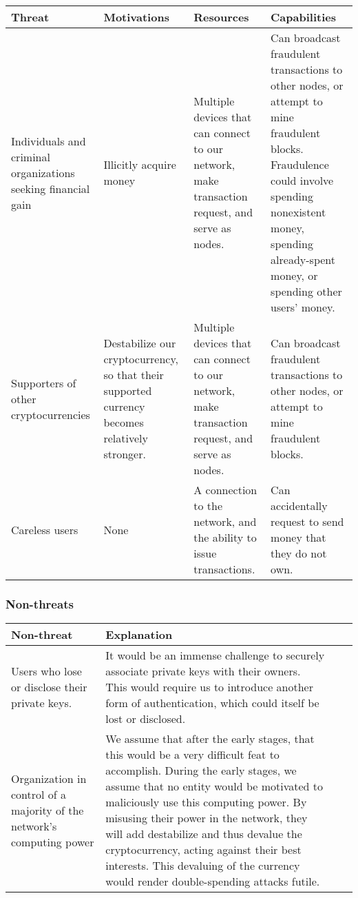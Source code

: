 \documentclass[12pt]{article}
\begin{document}
\begin{tabulary}{\linewidth}{|L|L|L|L|}
\hline
\textbf{Threat} & \textbf{Motivations} & \textbf{Resources} & \textbf{Capabilities} \\
\hline
Individuals and criminal organizations seeking financial gain & Illicitly acquire money & Multiple devices that can connect to our network, make transaction request, and serve as nodes. & Can broadcast fraudulent transactions to other nodes, or attempt to mine fraudulent blocks. Fraudulence could involve spending nonexistent money, spending already-spent money, or spending other users' money. \\
\hline
Supporters of other cryptocurrencies & Destabilize our cryptocurrency, so that their supported currency becomes relatively stronger. & Multiple devices that can connect to our network, make transaction request, and serve as nodes. & Can broadcast fraudulent transactions to other nodes, or attempt to mine fraudulent blocks. \\
\hline
Careless users & None & A connection to the network, and the ability to issue transactions. & Can accidentally request to send money that they do not own. \\
\hline
\end{tabulary}

\subsubsection*{Non-threats}

\begin{tabulary}{\linewidth}{|L|L|L|L|}
\hline
\textbf{Non-threat} & \textbf{Explanation}\\
\hline
Users who lose or disclose their private keys. & It would be an immense challenge to securely associate private keys with their owners. This would require us to introduce another form of authentication, which could itself be lost or disclosed. \\
\hline
Organization in control of a majority of the network's computing power & We assume that after the early stages, that this would be a very difficult feat to accomplish. During the early stages, we assume that no entity would be motivated to maliciously use this computing power. By misusing their power in the network, they will add destabilize and thus devalue the cryptocurrency, acting against their best interests. This devaluing of the currency would render double-spending attacks futile. \\
\hline
\end{tabulary}
\end{document}
